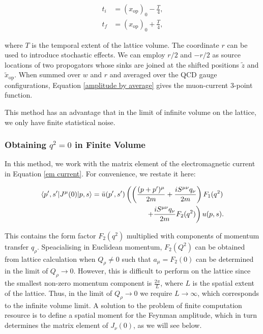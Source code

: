 \documentclass{article}
\numberwithin{equation}{section} %
\begin{document}
\begin{equation}
\begin{split}
t_i &= (x_\mathrm{op})_0 -\frac{T}{4},\\
t_f &= (x_\mathrm{op})_0 +\frac{T}{4},
\end{split}
\end{equation}

\noindent where $T$ is the temporal extent of the lattice volume. The coordinate $r$ can be used to introduce stochastic effects. We can employ $r/2$ and $-r/2$ as source locations of two propogators whose sinks are joined at the shifted positions $\tilde{z}$ and $\tilde{x}_\mathrm{op}$. When summed over $w$ and $r$ and averaged over the QCD gauge configurations, Equation \ref{amplitude by average} gives the muon-current 3-point function. 

This method has an advantage that in the limit of infinite volume on the lattice, we only have finite statistical noise.


\subsubsection{Obtaining $q^2=0$ in Finite Volume}

In this method, we work with the matrix element of the electromagnetic current in Equation \ref{em current}. For convenience, we restate it here:

\begin{equation}
\begin{split}
\mathinner{\langle{p',s'|J^\mu(0)|p,s}\rangle} = \bar{u}(p',s')\left( \left( \frac{(p+p')^\mu }{2m} + \frac{iS^{\mu\nu}q_\nu}{2m} \right) F_1(q^2)\right.&\\
\left. + \frac{iS^{\mu\nu}q_\nu}{2m}F_2(q^2) \right)u(p,s).&
\end{split}
\label{em current (repeated)}
\end{equation}

This contains the form factor $F_2(q^2)$ multiplied with components of momentum transfer $q_\rho$. Speacialising in Euclidean momentum, $F_2(Q^2)$ can be obtained from lattice calculation when $Q_\rho \neq 0$ such that $a_\mu = F_2(0)$ can be determined in the limit of $Q_\rho\rightarrow 0$. However, this is difficult to perform on the lattice since the smallest non-zero momentum component is $\frac{2\pi}{L}$, where $L$ is the spatial extent of the lattice. Thus, in the limit of $Q_\rho \rightarrow 0$ we require $L\rightarrow\infty$, which corresponds to the infinite volume limit. A solution to the problem of finite computation resource is to define a spatial moment for the Feynman amplitude, which in turn determines the matrix element of $J_\nu(0)$, as we will see below.
\end{document}
